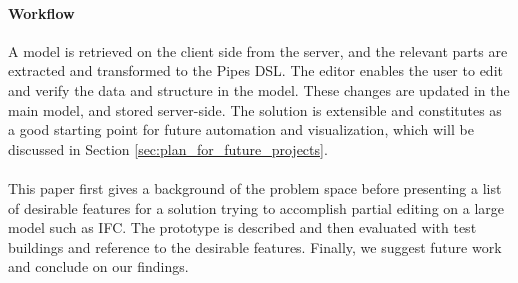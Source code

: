 \paragraph{Workflow}
\label{sec:workflow}
A model is retrieved on the client side from the server, and the relevant parts are extracted and transformed to the Pipes DSL. The editor enables the user to edit and verify the data and structure in the model. These changes are updated in the main model, and stored server-side. The solution is extensible and constitutes as a good starting point for future automation and visualization, which will be discussed in Section \ref{sec:plan_for_future_projects}.

\paragraph{} 
This paper first gives a background of the problem space before presenting a list of desirable features for a solution trying to accomplish partial editing on a large model such as IFC. The prototype is described and then evaluated with test buildings and reference to the desirable features. Finally, we suggest future work and conclude on our findings.
